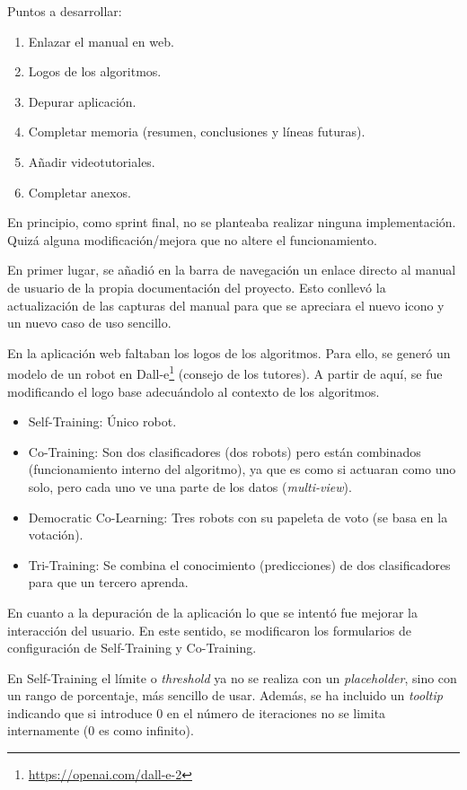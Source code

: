 Puntos a desarrollar:
\begin{enumerate}
    \item Enlazar el manual en web.
    \item Logos de los algoritmos.
    \item Depurar aplicación.
    \item Completar memoria (resumen, conclusiones y líneas futuras).
    \item Añadir videotutoriales.
    \item Completar anexos.
\end{enumerate}

En principio, como sprint final, no se planteaba realizar ninguna
implementación. Quizá alguna modificación/mejora que no altere el
funcionamiento.

En primer lugar, se añadió en la barra de navegación un enlace directo al manual
de usuario de la propia documentación del proyecto. Esto conllevó la
actualización de las capturas del manual para que se apreciara el nuevo icono y
un nuevo caso de uso sencillo.

En la aplicación web faltaban los logos de los algoritmos. Para ello, se generó
un modelo de un robot en Dall-e\footnote{\url{https://openai.com/dall-e-2}}
(consejo de los tutores). A partir de aquí, se fue modificando el logo base
adecuándolo al contexto de los algoritmos.
\begin{itemize}
    \item Self-Training: Único robot.
    \item Co-Training: Son dos clasificadores (dos robots) pero están combinados
    (funcionamiento interno del algoritmo), ya que es como si actuaran como uno
    solo, pero cada uno ve una parte de los datos (\emph{multi-view}).
    \item Democratic Co-Learning: Tres robots con su papeleta de voto (se basa en la votación).
    \item Tri-Training: Se combina el conocimiento (predicciones) de dos
    clasificadores para que un tercero aprenda.
\end{itemize}

En cuanto a la depuración de la aplicación lo que se intentó fue mejorar la
interacción del usuario. En este sentido, se modificaron los formularios de
configuración de Self-Training y Co-Training.

En Self-Training el límite o \textit{threshold} ya no se realiza con un
\textit{placeholder}, sino con un rango de porcentaje, más sencillo de usar.
Además, se ha incluido un \textit{tooltip} indicando que si introduce 0 en el
número de iteraciones no se limita internamente (0 es como infinito).

